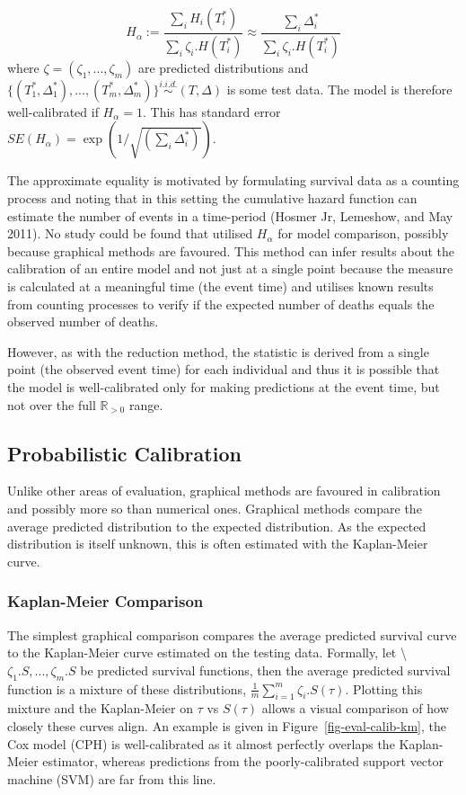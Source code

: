\documentclass[
  letterpaper,
]{scrbook}
\theoremstyle{plain}
\theoremstyle{definition}
\theoremstyle{remark}
\begin{document}
\[
H_\alpha := \frac{\sum_i H_i(T^*_i)}{\sum_i \zeta_i.H(T^*_i)} \approx \frac{\sum_i \Delta^*_i}{\sum_i \zeta_i.H(T^*_i)}
\] where \(\zeta = (\zeta_1,...,\zeta_m)\) are predicted distributions
and
\(\{(T_1^*,\Delta_1^*),...,(T_m^*,\Delta_m^*)\} \stackrel{i.i.d.}\sim(T, \Delta)\)
is some test data. The model is therefore well-calibrated if
\(H_\alpha = 1\). This has standard error
\(SE(H_\alpha) = \exp(1/\sqrt{(\sum_i \Delta^*_i)})\).

The approximate equality is motivated by formulating survival data as a
counting process and noting that in this setting the cumulative hazard
function can estimate the number of events in a time-period (Hosmer Jr,
Lemeshow, and May 2011). No study could be found that utilised
\(H_\alpha\) for model comparison, possibly because graphical methods
are favoured. This method can infer results about the calibration of an
entire model and not just at a single point because the measure is
calculated at a meaningful time (the event time) and utilises known
results from counting processes to verify if the expected number of
deaths equals the observed number of deaths.

However, as with the reduction method, the statistic is derived from a
single point (the observed event time) for each individual and thus it
is possible that the model is well-calibrated only for making
predictions at the event time, but not over the full \(\mathbb{R}_{>0}\)
range.

\hypertarget{sec-eval-distr-calib-prob}{%
\subsection{Probabilistic Calibration}\label{sec-eval-distr-calib-prob}}

Unlike other areas of evaluation, graphical methods are favoured in
calibration and possibly more so than numerical ones. Graphical methods
compare the average predicted distribution to the expected distribution.
As the expected distribution is itself unknown, this is often estimated
with the Kaplan-Meier curve.

\hypertarget{kaplan-meier-comparison}{%
\subsubsection{Kaplan-Meier Comparison}\label{kaplan-meier-comparison}}

The simplest graphical comparison compares the average predicted
survival curve to the Kaplan-Meier curve estimated on the testing data.
Formally, let \textbackslash{} \(\zeta_1.S,...,\zeta_m.S\) be predicted
survival functions, then the average predicted survival function is a
mixture of these distributions,
\(\frac{1}{m} \sum^{m}_{i = 1} \zeta_i.S(\tau)\). Plotting this mixture
and the Kaplan-Meier on \(\tau\) vs \(S(\tau)\) allows a visual
comparison of how closely these curves align. An example is given in
Figure~\ref{fig-eval-calib-km}, the Cox model (CPH) is well-calibrated
as it almost perfectly overlaps the Kaplan-Meier estimator, whereas
predictions from the poorly-calibrated support vector machine (SVM) are
far from this line.
\end{document}
